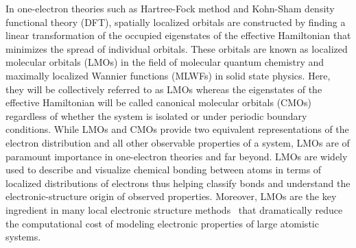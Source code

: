 \documentclass[aps,prl,reprint,amsmath,amssymb]{revtex4-1}
\begin{document}
In one-electron theories such as Hartree-Fock method and Kohn-Sham density functional theory (DFT), spatially localized orbitals are constructed by finding a linear transformation of the occupied eigenstates of the effective Hamiltonian that minimizes the spread of individual orbitals. 
These orbitals are known as localized molecular orbitals (LMOs) in the field of molecular quantum chemistry and maximally localized Wannier functions (MLWFs) in solid state physics. 
Here, they will be collectively referred to as LMOs whereas the eigenstates of the effective Hamiltonian will be called canonical molecular orbitals (CMOs) regardless of whether the system is isolated or under periodic boundary conditions.
While LMOs and CMOs provide two equivalent representations of the electron distribution and all other observable properties of a system, LMOs are of paramount importance in one-electron theories and far beyond.  
LMOs are widely used to describe and visualize chemical bonding between atoms in terms of localized distributions of electrons thus helping classify bonds and understand the electronic-structure origin of observed properties. 
Moreover, LMOs are the key ingredient in many local electronic structure methods~\cite{goedecker1999efficient, bowler2012methods, zalesny2011linear, RZK-localMP2, RZK-localCC} that dramatically reduce the computational cost of modeling electronic properties of large atomistic systems.


%
\end{document}
